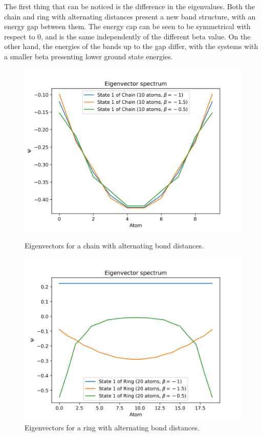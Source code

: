 \documentclass{article}
\begin{document}
The first thing that can be noticed is the difference in the eigenvalues. Both the chain and ring with alternating distances present a new band structure, with an energy gap between them. The energy cap can be seen to be symmetrical with respect to $0$, and is the same independently of the different beta value. On the other hand, the energies of the bands up to the gap differ, with the systems with a smaller beta presenting lower ground state energies.



\begin{figure}[h]
    \centering
    \begin{minipage}{0.47\textwidth}
        \centering
        \includegraphics[width=\textwidth]{Figures/chain_beta_eigenvectors.jpg}
        \caption{Eigenvectors for a chain with alternating bond distances.}
        \label{fig:chain_alternating_beta_vec}
    \end{minipage}
    \hfill
    \begin{minipage}{0.47\textwidth}
        \centering
        \includegraphics[width=\textwidth]{Figures/ring_beta_eigenvectors.jpg}
        \caption{Eigenvectors for a ring with alternating bond distances.}
        \label{fig:ring_alternating_beta_vec}
    \end{minipage}
\end{figure}





\end{document}

